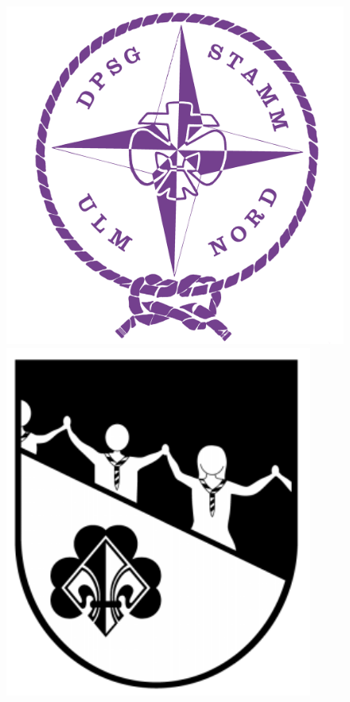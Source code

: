 \begin{titlepage}
\begin{center}
\begin{figure}[h!]
\begin{minipage}{.2\linewidth}
                \centering
                \vspace{12pt}
                \includegraphics[width=1.05\textwidth]{../img/dpsg_ulm-nord.png}
            \end{minipage}%
            \begin{minipage}{.2\linewidth}
                \centering
                \includegraphics[width=0.9\textwidth]{../img/bdp_weisse-rotte.png}

\end{minipage}
\end{figure}
\end{center}
\end{titlepage}
